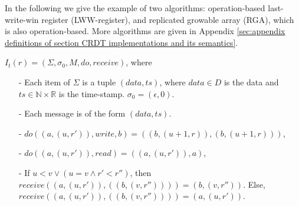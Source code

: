 In the following we give the example of two algorithms: operation-based last-write-win register (LWW-register), and replicated growable array (RGA), which is also operation-based. More algorithms are given in Appendix \ref{sec:appendix definitions of section CRDT implementations and its semantics}.

\begin{example}
\label{definition:LWW-register}
$I_t(r) = (\Sigma, \sigma_0, M, \mathit{do},\mathit{receive})$, where

\begin{itemize}
\setlength{\itemsep}{0.5pt}
\item[-] Each item of $\Sigma$ is a tuple $(\mathit{data},\mathit{ts})$, where $\mathit{data} \in D$ is the data and $\mathit{ts} \in \mathbb{N} \times \mathbb{R}$ is the time-stamp. $\sigma_0 = (\epsilon, 0)$.

\item[-] Each message is of the form $(\mathit{data},\mathit{ts})$.

\item[-] $\mathit{do}((a,(u,r')),\mathit{write},b) = ((b,(u+1,r)),(b,(u+1,r)))$,

\item[-] $\mathit{do}((a,(u,r')),\mathit{read}) = ((a,(u,r')),a)$,

\item[-] If $u<v \vee (u=v \wedge r' < r'')$, then $\mathit{receive}((a,(u,r')), ((b,(v,r'')))) = (b,(v,r''))$. Else, $\mathit{receive}((a,(u,r')), ((b,(v,r'')))) = (a,(u,r'))$.
\end{itemize}
\end{example}


